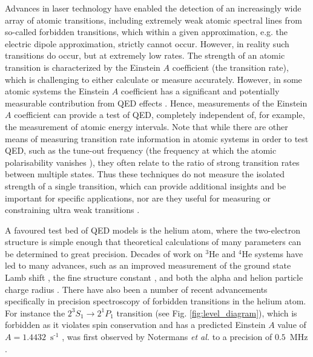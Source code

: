 \documentclass[%
 reprint,
 amsmath,amssymb,
 aps,
 prl,
]{revtex4-2}
\newcommand{\brycecom}[1]{{\color{ProcessBlue}[{#1}]\normalcolor}} %
\newcommand{\MetastableState}{2^{3\!}S_1}%
\begin{document}
Advances in laser technology have enabled the detection of an increasingly wide array of atomic transitions, including extremely weak atomic spectral lines from so-called forbidden transitions, which within a given approximation, e.g. the electric dipole approximation, strictly cannot occur. However, in reality such transitions do occur, but at extremely low rates.
The strength of an atomic transition is characterized by the Einstein \(A\) coefficient (the transition rate), which is challenging to either calculate or measure accurately. However, in some atomic systems the Einstein \(A\) coefficient has a significant and potentially measurable contribution from QED effects \cite{PhysRevA.79.032515}. Hence, measurements of the Einstein \(A\) coefficient can provide a test of QED, completely independent of, for example, the measurement of atomic energy intervals. Note that while there are other means of measuring transition rate information in atomic systems in order to test QED, such as the tune-out frequency (the frequency at which the atomic polarisability vanishes \cite{PhysRevA.75.053612,PhysRevLett.115.043004,PhysRevA.99.040502}), they often relate to the ratio of strong transition rates between multiple states. Thus these techniques do not measure the isolated strength of a single transition, which can provide additional insights and be important for specific applications, nor are they useful for measuring or constraining ultra weak transitions \cite{Pickering11}.



A favoured test bed of QED models is the helium atom, where the two-electron structure is simple enough that theoretical calculations of many parameters can be determined to great precision. Decades of work on \(^3\)He and \(^4\)He systems have led to many advances, such as an improved measurement of the ground state Lamb shift \cite{PhysRevLett.105.063001,PhysRevLett.80.3475}, the fine structure constant \cite{PhysRevLett.105.123001,PhysRevLett.121.143002}, and both the alpha and helion particle charge radius \cite{Rengelink2018,PhysRevLett.108.143001}. There have also been a number of recent advancements specifically in precision spectroscopy of forbidden
transitions in the helium atom.
For instance the \(\MetastableState \rightarrow 2^{1\!}P_1\) transition (see Fig. \ref{fig:level_diagram}), which is forbidden as it violates spin conservation and has a predicted Einstein \(A\) value of $A=1.4432$~$\text{s}^{\text{-}1}$ \cite{Drake_2007}, was first observed by Notermans \textit{et al.} to a precision of \(0.5\)~MHz \cite{PhysRevLett.112.253002}. 
\end{document}
